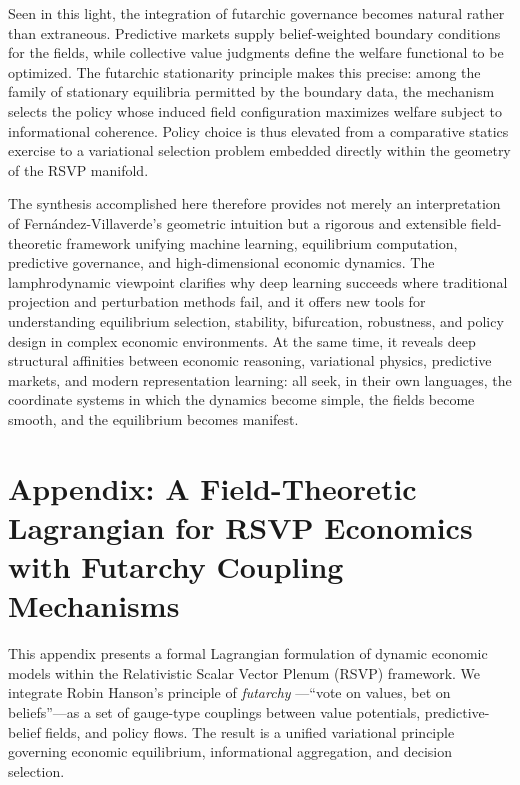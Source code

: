 \documentclass[12pt]{article}
\begin{document}
Seen in this light, the integration of futarchic governance becomes natural
rather than extraneous.  Predictive markets supply belief-weighted boundary
conditions for the fields, while collective value judgments define the welfare
functional to be optimized.  The futarchic stationarity principle makes this
precise: among the family of stationary equilibria permitted by the boundary
data, the mechanism selects the policy whose induced field configuration
maximizes welfare subject to informational coherence.  Policy choice is thus
elevated from a comparative statics exercise to a variational selection problem
embedded directly within the geometry of the RSVP manifold.

The synthesis accomplished here therefore provides not merely an interpretation
of Fernández-Villaverde’s geometric intuition but a rigorous and extensible
field-theoretic framework unifying machine learning, equilibrium computation,
predictive governance, and high-dimensional economic dynamics.  The
lamphrodynamic viewpoint clarifies why deep learning succeeds where traditional
projection and perturbation methods fail, and it offers new tools for
understanding equilibrium selection, stability, bifurcation, robustness, and
policy design in complex economic environments.  At the same time, it reveals
deep structural affinities between economic reasoning, variational physics,
predictive markets, and modern representation learning: all seek, in their own
languages, the coordinate systems in which the dynamics become simple, the
fields become smooth, and the equilibrium becomes manifest.


\appendix

\section*{Appendix: A Field-Theoretic Lagrangian for RSVP Economics\\
with Futarchy Coupling Mechanisms}

This appendix presents a formal Lagrangian formulation of dynamic
economic models within the Relativistic Scalar Vector Plenum (RSVP)
framework. We integrate Robin Hanson’s principle of \emph{futarchy}
---“vote on values, bet on beliefs”—as a set of gauge-type couplings
between value potentials, predictive-belief fields, and policy flows.
The result is a unified variational principle governing economic
equilibrium, informational aggregation, and decision selection.
\end{document}
